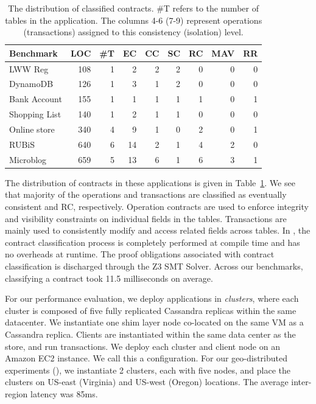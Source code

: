\begin{table}
\setlength{\tabcolsep}{4pt}
{\sffamily \small
\begin{center}
\caption{The distribution of classified contracts. \#T refers to the number of
tables in the application. The columns 4-6 (7-9) represent operations
(transactions) assigned to this consistency (isolation) level.}
\label{tab:ctrts}
\begin{tabular} {|l|r|r|r|r|r|r|r|r|}
\hline
{\bf Benchmark} & {\bf LOC} & {\bf \#T} & {\bf EC} & {\bf CC} & {\bf SC} & {\bf RC} & {\bf MAV} & {\bf RR} \\
\hline
{LWW Reg} & 108 & 1 & 2 & 2 & 2 & 0 & 0 & 0 \\
{DynamoDB} & 126 & 1 & 3 & 1 & 2 & 0 & 0 & 0 \\
{Bank Account} & 155 & 1 & 1 & 1 & 1 & 1 & 0 & 1 \\
{Shopping List} & 140 & 1 & 2 & 1 & 1 & 0 & 0 & 0 \\
{Online store} & 340 & 4 & 9 & 1 & 0 & 2 & 0 & 1 \\
{RUBiS} & 640 & 6 & 14 & 2 & 1 & 4 & 2 & 0 \\
{Microblog} & 659 & 5 & 13 & 6 & 1 & 6 & 3 & 1 \\
\hline
\end{tabular}
\end{center} }
\end{table}

The distribution of contracts in these applications is given in
Table~\ref{tab:ctrts}. We see that majority of the operations and transactions
are classified as eventually consistent and RC, respectively. Operation
contracts are used to enforce integrity and visibility constraints on
individual fields in the tables. Transactions are mainly used to consistently
modify and access related fields across tables. In \name, the contract
classification process is completely performed at compile time and has no
overheads at runtime. The proof obligations associated with contract
classification is discharged through the Z3 SMT Solver. Across our benchmarks,
classifying a contract took 11.5 milliseconds on average.

For our performance evaluation, we deploy \name applications in
\emph{clusters}, where each cluster is composed of five fully replicated
Cassandra replicas within the same datacenter. We instantiate one shim layer
node co-located on the same VM as a Cassandra replica. Clients are instantiated
within the same data center as the store, and run transactions. We deploy each
cluster and client node on an  Amazon EC2 instance. We call this
a  configuration. For our geo-distributed experiments (), we
instantiate 2 clusters, each with five nodes, and place the clusters on US-east
(Virginia) and US-west (Oregon) locations. The average inter-region latency was
85ms.

